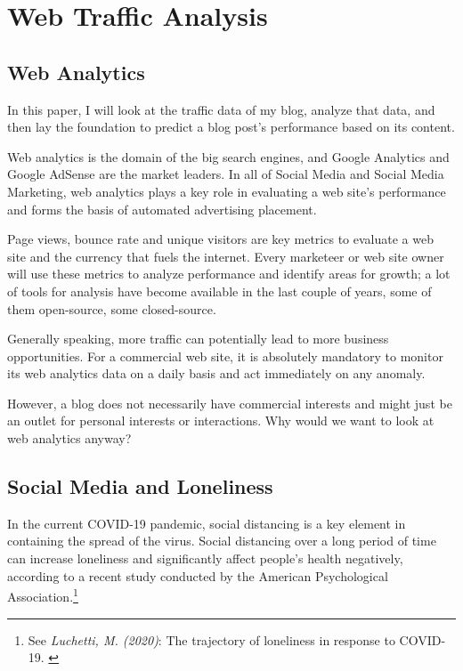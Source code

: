 %
%

\pagebreak
\section{Web Traffic Analysis}

\onehalfspacing

\subsection{Web Analytics}

In this paper, I will look at the traffic data of my blog, analyze that data, and then lay the foundation to predict a blog post's performance based on its content.

Web analytics is the domain of the big search engines, and Google Analytics and Google AdSense are the market leaders. In all of Social Media and Social Media Marketing, web analytics plays a key role in evaluating a web site's performance and forms the basis of automated advertising placement.

Page views, bounce rate and unique visitors are key metrics to evaluate a web site and the currency that fuels the internet. Every marketeer or web site owner will use these metrics to analyze performance and identify areas for growth; a lot of tools for analysis have become available in the last couple of years, some of them open-source, some closed-source.

Generally speaking, more traffic can potentially lead to more business opportunities. For a commercial web site, it is absolutely mandatory to monitor its web analytics data on a daily basis and act immediately on any anomaly.

However, a blog does not necessarily have commercial interests and might just be an outlet for personal interests or interactions. Why would we want to look at web analytics anyway?

\subsection{Social Media and Loneliness}

In the current COVID-19 pandemic, social distancing is a key element in containing the spread of the virus. Social distancing over a long period of time can increase loneliness and significantly affect people's health negatively, according to a recent study conducted by the American Psychological Association.\footnote{See \textit{Luchetti, M. (2020)}: The trajectory of loneliness in response to COVID-19. \cite{apaLoneliness}}


